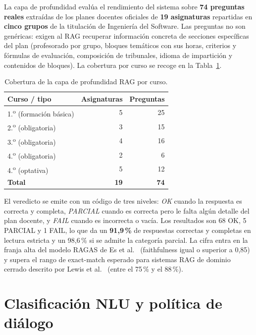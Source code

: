 La capa de profundidad evalúa el rendimiento del sistema sobre \textbf{74 preguntas reales} extraídas de los planes docentes oficiales de \textbf{19 asignaturas} repartidas en \textbf{cinco grupos} de la titulación de Ingeniería del Software. Las preguntas no son genéricas: exigen al RAG recuperar información concreta de secciones específicas del plan (profesorado por grupo, bloques temáticos con sus horas, criterios y fórmulas de evaluación, composición de tribunales, idioma de impartición y contenidos de bloques). La cobertura por curso se recoge en la Tabla~\ref{tab:rag-cobertura}.

\begin{table}[hbtp]
\centering
\caption{Cobertura de la capa de profundidad RAG por curso.}\label{tab:rag-cobertura}
\begin{tabular}{lrr}
\hline
\textbf{Curso / tipo} & \textbf{Asignaturas} & \textbf{Preguntas} \\
\hline
1.\textsuperscript{o} (formación básica) & 5 & 25 \\
2.\textsuperscript{o} (obligatoria) & 3 & 15 \\
3.\textsuperscript{o} (obligatoria) & 4 & 16 \\
4.\textsuperscript{o} (obligatoria) & 2 & 6 \\
4.\textsuperscript{o} (optativa) & 5 & 12 \\
\hline
\textbf{Total} & \textbf{19} & \textbf{74} \\
\hline
\end{tabular}
\end{table}

El veredicto se emite con un código de tres niveles: \textit{OK} cuando la respuesta es correcta y completa, \textit{PARCIAL} cuando es correcta pero le falta algún detalle del plan docente, y \textit{FAIL} cuando es incorrecta o vacía. Los resultados son 68 OK, 5 PARCIAL y 1 FAIL, lo que da un \textbf{91,9\,\%} de respuestas correctas y completas en lectura estricta y un 98,6\,\% si se admite la categoría parcial. La cifra entra en la franja alta del modelo RAGAS de Es et al.~\cite{es2024ragas} (faithfulness igual o superior a 0,85) y supera el rango de exact-match esperado para sistemas RAG de dominio cerrado descrito por Lewis et al.~\cite{lewis2020retrieval} (entre el 75\,\% y el 88\,\%).

\section{Clasificación NLU y política de diálogo}\label{sec:pruebas-nlu}

